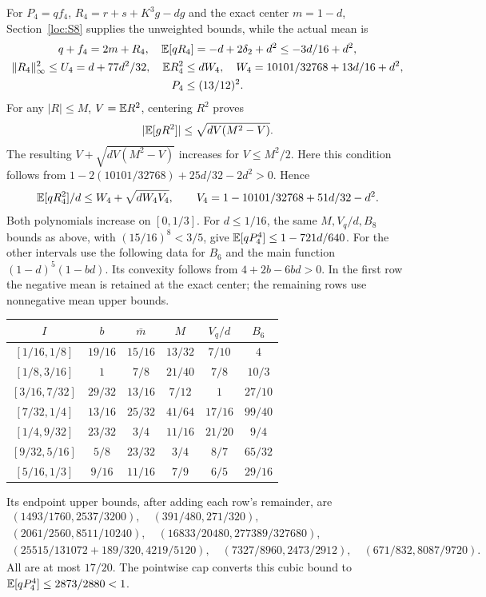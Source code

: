 For $P_4=qf_4$, $R_4=r+s+K^3g-dg$ and the exact center $m=1-d$,
Section~\ref{loc:S8} supplies the unweighted bounds, while the actual mean is
\begin{gather*}
 q+f_4=2m+R_4,\quad \mathbb E[qR_4]=-d+2\delta_{2}+d^2\le-3d/16+d^2,\\
 \|R_4\|_\infty^2\le U_4=d+77d^2/32,\quad
 \mathbb E R_4^2\le dW_4,\quad W_4=10101/32768+13d/16+d^2,\\
 P_4\le(13/12)^2.
\end{gather*}
For any $|R|\le M$, $V=\mathbb E R^2$, centering $R^2$ proves
\begin{equation}\label{eq:compact-centered-variance}
 |\mathbb E[gR^2]|\le\sqrt{dV(M^2-V)}.
\end{equation}
The resulting $V+\sqrt{dV(M^2-V)}$ increases for $V\le M^2/2$.
Here this condition follows from
$1-2(10101/32768)+25d/32-2d^2>0$. Hence
\[
 \mathbb E[qR_4^2]/d\le W_4+\sqrt{dW_4V_4},\qquad
 V_4=1-10101/32768+51d/32-d^2.
\]
Both polynomials increase on $[0,1/3]$.
For $d\le1/16$, the same $M,V_q/d,B_8$ bounds as above, with
$(15/16)^8<3/5$, give $\mathbb E[qP_4^4]\le1-721d/640$.
For the other intervals use the following data for $B_6$ and the main
function $(1-d)^5(1-bd)$. Its convexity follows from $4+2b-6bd>0$.
In the first row the negative mean is retained at the exact center;
the remaining rows use nonnegative mean upper bounds.
\begin{center}\small
\begin{tabular}{@{}cccccc@{}}\toprule
$I$&$b$&$\bar m$&$M$&$V_q/d$&$B_6$\\\midrule
$[1/16,1/8]$&$19/16$&$15/16$&$13/32$&$7/10$&$4$\\
$[1/8,3/16]$&$1$&$7/8$&$21/40$&$7/8$&$10/3$\\
$[3/16,7/32]$&$29/32$&$13/16$&$7/12$&$1$&$27/10$\\
$[7/32,1/4]$&$13/16$&$25/32$&$41/64$&$17/16$&$99/40$\\
$[1/4,9/32]$&$23/32$&$3/4$&$11/16$&$21/20$&$9/4$\\
$[9/32,5/16]$&$5/8$&$23/32$&$3/4$&$8/7$&$65/32$\\
$[5/16,1/3]$&$9/16$&$11/16$&$7/9$&$6/5$&$29/16$\\\bottomrule
\end{tabular}
\end{center}
Its endpoint upper bounds, after adding each row's remainder, are
\begin{gather*}
 (1493/1760,2537/3200),\quad(391/480,271/320),\\
 (2061/2560,8511/10240),\quad(16833/20480,277389/327680),\\
 (25515/131072+189/320,4219/5120),\quad
 (7327/8960,2473/2912),\quad(671/832,8087/9720).
\end{gather*}
All are at most $17/20$. The pointwise cap converts this cubic bound to
$\mathbb E[qP_4^4]\le2873/2880<1$.


